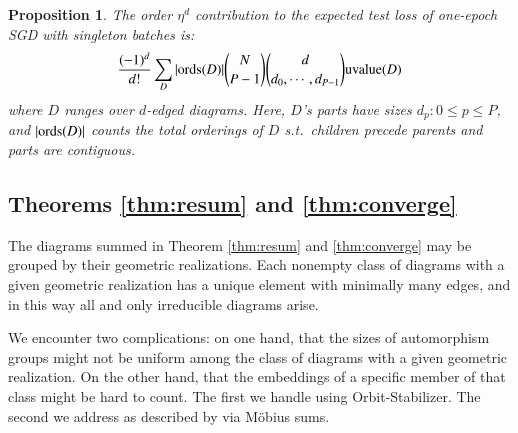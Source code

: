 \documentclass{article}
\theoremstyle{plain}
\newtheorem{prop}{Proposition}
\theoremstyle{definition}
\newcommand{\uvalue}{\text{\textnormal{uvalue}}}
\newcommand{\ords}{\text{\textnormal{ords}}}
\begin{document}
        \begin{prop} \label{prop:vanilla}
            The order $\eta^d$ contribution to the expected test loss of
            one-epoch SGD with singleton batches is:
            \begin{equation*}\label{eq:sgdbasiccoef}
                \frac{(-1)^d}{d!} \sum_{D} 
                |\ords(D)| {N \choose P-1} {d \choose d_0,\cdots,d_{P-1}}
                \uvalue(D)
            \end{equation*}
            where $D$ ranges over $d$-edged diagrams.  Here, $D$'s parts have
            sizes $d_p: 0\leq p\leq P$, and $|\ords(D)|$ counts the total
            orderings of $D$ s.t.\ children precede parents and parts are
            contiguous.
        \end{prop}

    \subsection{Theorems \ref{thm:resum} and \ref{thm:converge}}    \label{appendix:re-summation}

        The diagrams summed in Theorem \ref{thm:resum} and \ref{thm:converge}
        may be grouped by their geometric realizations.  Each nonempty class of
        diagrams with a given geometric realization has a unique element with
        minimally many edges, and in this way all and only irreducible diagrams
        arise. 

        We encounter two complications: on one hand, that the sizes of
        automorphism groups might not be uniform among the class of diagrams
        with a given geometric realization.  On the other hand, that the
        embeddings of a specific member of that class might be hard to count.
        The first we handle using Orbit-Stabilizer.  The second we address as
        described by \label{subsubsect:mobius} via M\"obius sums.
           
\end{document}
